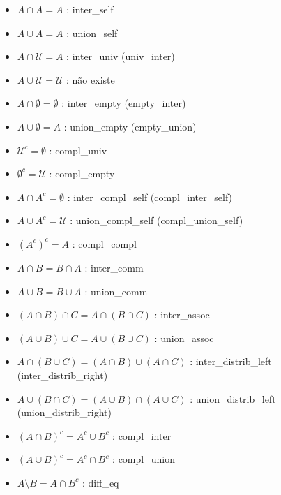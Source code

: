   \begin{itemize}
    \item $A \cap A = A$ : {\selectfont inter\_self}
    \item $A \cup A = A$ : {\selectfont union\_self}
    \item $A \cap \mathcal U = A$ : {\selectfont inter\_univ} ({\selectfont univ\_inter})
    \item $A \cup \mathcal U = \mathcal U$ : não existe
    \item $A \cap \emptyset = \emptyset$ : {\selectfont inter\_empty} ({\selectfont empty\_inter})
    \item $A \cup \emptyset = A$ : {\selectfont union\_empty} ({\selectfont empty\_union})
    \item $\mathcal U ^c = \emptyset$ : {\selectfont compl\_univ}
    \item $\emptyset ^c = \mathcal U$ : {\selectfont compl\_empty}
    \item $A \cap A^c = \emptyset$ : {\selectfont inter\_compl\_self} ({\selectfont compl\_inter\_self})
    \item $A \cup A^c = \mathcal U$ : {\selectfont union\_compl\_self} ({\selectfont compl\_union\_self})
    \item $(A^c)^c = A$ : {\selectfont compl\_compl}
    \item $A \cap B = B \cap A$ : {\selectfont inter\_comm}
    \item $A \cup B = B \cup A$ : {\selectfont union\_comm}
    \item $(A \cap B) \cap C = A \cap (B \cap C)$ : {\selectfont inter\_assoc}
    \item $(A \cup B) \cup C = A \cup (B \cup C)$ : {\selectfont union\_assoc}
    \item $A \cap (B \cup C) = (A \cap B) \cup (A \cap C)$ : {\selectfont inter\_distrib\_left} ({\selectfont inter\_distrib\_right})
    \item $A \cup (B \cap C) = (A \cup B) \cap (A \cup C)$ : {\selectfont union\_distrib\_left} ({\selectfont union\_distrib\_right})
    \item $(A \cap B)^c = A^c \cup B^c$ : {\selectfont compl\_inter}
    \item $(A \cup B)^c = A^c \cap B^c$ : {\selectfont compl\_union}
    \item $A \setminus B = A \cap B^c$ : {\selectfont diff\_eq}
  \end{itemize}

